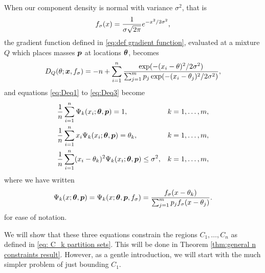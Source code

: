 	When our component density is normal with variance $\sigma^2$, that is
	\begin{equation}
		f_\sigma(x) = \frac{1}{\sigma \sqrt{2\pi}} e^{-x^2/2\sigma^2},
	\end{equation}
	the gradient function defined in \eqref{eq:def gradient function}, evaluated at a mixture $Q$ which places masses ${\bm{{p}}}$ at locations ${\bm{{\theta}}}$, becomes
	\begin{equation}
		D_Q(\theta; {\bm{{x}}}, f_\sigma) = - n + \sum_{i = 1}^n \frac{\exp({-(x_i - \theta)^2/2\sigma^2})}{\sum_{j=1}^m p_j \exp({-(x_i - \theta_j)^2/2\sigma^2})},
	\end{equation}
	and equations \eqref{eq:Deq1} to \eqref{eq:Deq3} become
	\begin{align}
		&\frac{1}{n} \sum_{i=1}^n \Psi_k(x_i;{\bm{{\theta}}},{\bm{{p}}}) = 1, &&k = 1,\dots, m, \label{eq:PsiEq1}\\
		&\frac{1}{n} \sum_{i=1}^n x_i \Psi_k(x_i;{\bm{{\theta}}},{\bm{{p}}}) = \theta_k, &&k = 1,\dots, m,\label{eq:PsiEq2}\\
		&\frac{1}{n} \sum_{i=1}^n (x_i - \theta_k)^2 \Psi_k(x_i;{\bm{{\theta}}},{\bm{{p}}}) \leq \sigma^2, &&k = 1,\dots, m,
		\label{eq:PsiEq3}
	\end{align}
	 where we have written
	\begin{equation}{}
		\Psi_k(x;{\bm{{\theta}}},{\bm{{p}}}) = \Psi_k(x;{\bm{{\theta}}},{\bm{{p}}}, f_\sigma) = \frac{f_\sigma(x - \theta_k)}{\sum_{j=1}^m p_j f_\sigma(x - \theta_j)}.
	\end{equation}
	for ease of notation.

	We will show that these three equations constrain the regions $C_1, \dots, C_n$ as defined in \eqref{eq: C_k partition sets}. This will be done in Theorem \ref{thm:general n constraints result}. However, as a gentle introduction, we will start with the much simpler problem of just bounding $C_1$.

